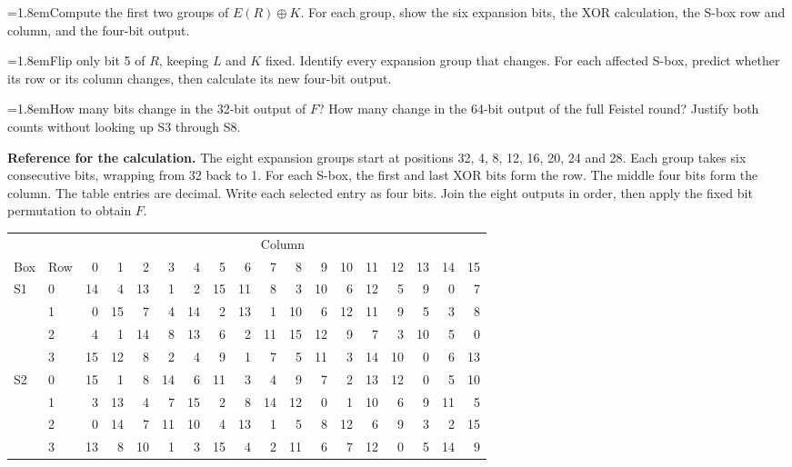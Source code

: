 \documentclass[11pt,a4paper]{article}
\newcommand{\task}[2]{\par\noindent\hangindent=1.8em\hangafter=1\makebox[1.8em][l]{\bfseries\color{teal}(#1)}#2\par}
\begin{document}
\task{a}{Compute the first two groups of \(E(R)\oplus K\). For each group, show the six expansion bits, the XOR calculation, the S-box row and column, and the four-bit output.}
\task{b}{Flip only bit 5 of \(R\), keeping \(L\) and \(K\) fixed. Identify every expansion group that changes. For each affected S-box, predict whether its row or its column changes, then calculate its new four-bit output.}
\task{c}{How many bits change in the 32-bit output of \(F\)? How many change in the 64-bit output of the full Feistel round? Justify both counts without looking up S3 through S8.}

\textbf{Reference for the calculation.}
The eight expansion groups start at positions 32, 4, 8, 12, 16, 20, 24 and 28. Each group takes six consecutive bits, wrapping from 32 back to 1. For each S-box, the first and last XOR bits form the row. The middle four bits form the column. The table entries are decimal. Write each selected entry as four bits. Join the eight outputs in order, then apply the fixed bit permutation to obtain $F$.

\begin{center}
{\normalsize\setlength{\tabcolsep}{5.0pt}
\begin{tabular}{@{}ll*{16}{r}@{}}
\toprule
 & & \multicolumn{16}{c}{Column}\\
Box & Row & 0 & 1 & 2 & 3 & 4 & 5 & 6 & 7 & 8 & 9 & 10 & 11 & 12 & 13 & 14 & 15\\
\midrule
S1 & 0 & 14 & 4 & 13 & 1 & 2 & 15 & 11 & 8 & 3 & 10 & 6 & 12 & 5 & 9 & 0 & 7\\
   & 1 & 0 & 15 & 7 & 4 & 14 & 2 & 13 & 1 & 10 & 6 & 12 & 11 & 9 & 5 & 3 & 8\\
   & 2 & 4 & 1 & 14 & 8 & 13 & 6 & 2 & 11 & 15 & 12 & 9 & 7 & 3 & 10 & 5 & 0\\
   & 3 & 15 & 12 & 8 & 2 & 4 & 9 & 1 & 7 & 5 & 11 & 3 & 14 & 10 & 0 & 6 & 13\\
\midrule
S2 & 0 & 15 & 1 & 8 & 14 & 6 & 11 & 3 & 4 & 9 & 7 & 2 & 13 & 12 & 0 & 5 & 10\\
   & 1 & 3 & 13 & 4 & 7 & 15 & 2 & 8 & 14 & 12 & 0 & 1 & 10 & 6 & 9 & 11 & 5\\
   & 2 & 0 & 14 & 7 & 11 & 10 & 4 & 13 & 1 & 5 & 8 & 12 & 6 & 9 & 3 & 2 & 15\\
   & 3 & 13 & 8 & 10 & 1 & 3 & 15 & 4 & 2 & 11 & 6 & 7 & 12 & 0 & 5 & 14 & 9\\
\bottomrule
\end{tabular}}
\end{center}
\end{document}
